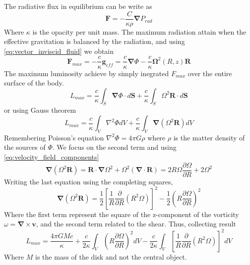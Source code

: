 \documentclass[a4paper,12pt,modern]{aastex62}
\renewcommand{\vec}[1]{\mathbf{#1}}
\begin{document}
The radiative flux in equilibrium can be write as
\begin{equation}
\mathbf{F}= -\frac{C}{\kappa \rho}\mathbf{\nabla}P_{rad}
\end{equation}
Where $\kappa$ is the opacity per unit mass. The maximum radiation attain when the effective gravitation is balanced by the radiation, and using \ref{eq:vector_inviscid_fluid} we obtain
\begin{equation}\label{eq:Fmax-rad}
    \vec F_{max} = -\frac{c}{\kappa}\vec g_{eff} = \frac{c}{\kappa}\vec\nabla\Phi - \frac{c}{\kappa}\vec \Omega^2(R,z)\vec R
\end{equation}
The maximum luminosity achieve by simply inegrated $F_{max}$ over the entire surface of the body.
\begin{equation}
    L_{max} = \frac{c}{\kappa} \int_S \vec\nabla\Phi\cdot d\vec S + \frac{c}{\kappa}\int_S \Omega^2\vec R \cdot d\vec S
\end{equation}
or using Gauss theorem 
\begin{equation}
    L_{max} = \frac{c}{\kappa} \int_V \nabla^2\Phi dV + \frac{c}{\kappa}\int_V \vec\nabla(\Omega^2\vec R) dV
\end{equation}
Remembering Poisson's equation $\nabla^2\Phi=4\pi G \rho$ where $\rho$ is the matter density of the sources of $\Phi$. We focus on the second term and using \ref{eq:velocity_field_components}
\begin{equation}
    \vec\nabla(\Omega^2\vec R) = \vec R \cdot \vec\nabla\Omega^2 + \Omega^2(\vec\nabla\cdot\vec R) = 2R\Omega \frac{\partial\Omega}{\partial R} + 2\Omega^2
\end{equation}
Writing the last equation using the completing squares,
\begin{equation}
    \vec\nabla(\Omega^2\vec R) = \frac{1}{2}\left[ \frac{1}{R}\frac{\partial}{\partial R}(R^2\Omega) \right]^2 - \frac{1}{2} \left( R\frac{\partial \Omega}{\partial R} \right)^2
\end{equation}
Where the first term represent the square of the z-component of the vorticity $\omega = \mathbf{\nabla} \times \mathbf{v}$, and the second term related to the shear.
Thus, collecting result
\begin{equation}
    L_{max}=\frac{4\pi G M c}{\kappa}+
    \frac{c}{2\kappa}\int_V \left( R\frac{\partial \Omega}{\partial R} \right)^2 dV -
    \frac{c}{2\kappa}\int_V \left[ \frac{1}{R}\frac{\partial}{\partial R}(R^2\Omega) \right]^2 dV
\end{equation}
Where $M$ is the mass of the disk and not the central object.
\end{document}

